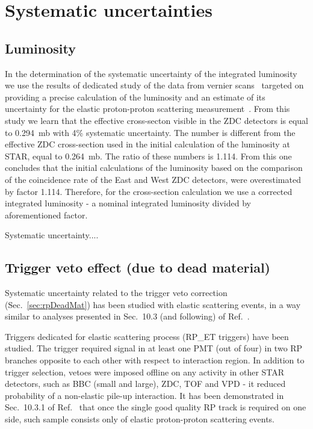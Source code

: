 

\chapter{Systematic uncertainties}\label{chap:systematicErrors} 

\section{Luminosity}\label{sec:lumiSyst}
In the determination of the systematic uncertainty of the integrated luminosity we use the results of dedicated study of the data from vernier scans~\cite{lumiNote} targeted on providing a precise calculation of the luminosity and an estimate of its uncertainty for the elastic proton-proton scattering measurement~\cite{elasticNote}. From this study we learn that the effective cross-secton visible in the ZDC detectors is equal to 0.294~mb with 4\% systematic uncertainty. The number is different from the effective ZDC cross-section used in the initial calculation of the luminosity at STAR, equal to 0.264~mb. The ratio of these numbers is 1.114. From this one concludes that the initial calculations of the luminosity based on the comparison of the coincidence rate of the East and West ZDC detectors, were overestimated by factor 1.114. Therefore, for the cross-section calculation we use a corrected integrated luminosity - a nominal integrated luminosity divided by aforementioned factor.

Systematic uncertainty....

\section{Trigger veto effect (due to dead material)}\label{sec:systTrigVeto}

Systematic uncertainty related to the trigger veto correction (Sec.~\ref{sec:rpDeadMat}) has been studied with elastic scattering events, in a way similar to analyses presented in Sec.~10.3 (and following) of Ref.~\cite{supplementaryNote}. 

Triggers dedicated for elastic scattering process (RP\_ET triggers) have been studied. The trigger required signal in at least one PMT (out of four) in two RP branches opposite to each other with respect to interaction region. In addition to trigger selection, vetoes were imposed offline on any activity in other STAR detectors, such as BBC (small and large), ZDC, TOF and VPD - it reduced probability of a non-elastic pile-up interaction. It has been demonstrated in Sec.~10.3.1 of Ref.~\cite{supplementaryNote} that once the single good quality RP track is required on one side, such sample consists only of elastic proton-proton scattering events.

